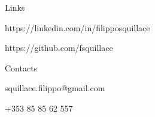 \begin{cvlist}{Links}
  \item[\textbullet] \footnotesize{https://linkedin.com/in/filipposquillace}
  \item[\textbullet] \footnotesize{https://github.com/fsquillace}
\end{cvlist}
\begin{cvlist}{Contacts\footnotemark[3]}
  \item[\ding{41}] squillace.filippo@gmail.com
  \item[\ding{37}] +353 85 85 62 557
\end{cvlist}